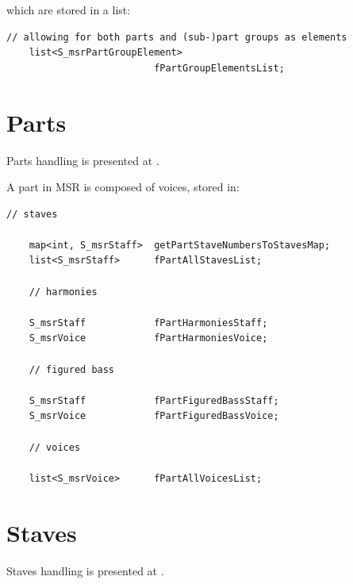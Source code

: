 which are stored in a list:
\begin{lstlisting}[language=CPlusPlus]
    // allowing for both parts and (sub-)part groups as elements
    list<S_msrPartGroupElement>
                          fPartGroupElementsList;
\end{lstlisting}


\section{Parts}\label{Parts}

Parts handling is presented at .

A part in MSR is composed of voices, stored in:
\begin{lstlisting}[language=CPlusPlus]
    // staves

    map<int, S_msrStaff>  getPartStaveNumbersToStavesMap;
    list<S_msrStaff>      fPartAllStavesList;

    // harmonies

    S_msrStaff            fPartHarmoniesStaff;
    S_msrVoice            fPartHarmoniesVoice;

    // figured bass

    S_msrStaff            fPartFiguredBassStaff;
    S_msrVoice            fPartFiguredBassVoice;

    // voices

    list<S_msrVoice>      fPartAllVoicesList;
\end{lstlisting}


\section{Staves}\label{Staves}

Staves handling is presented at .

